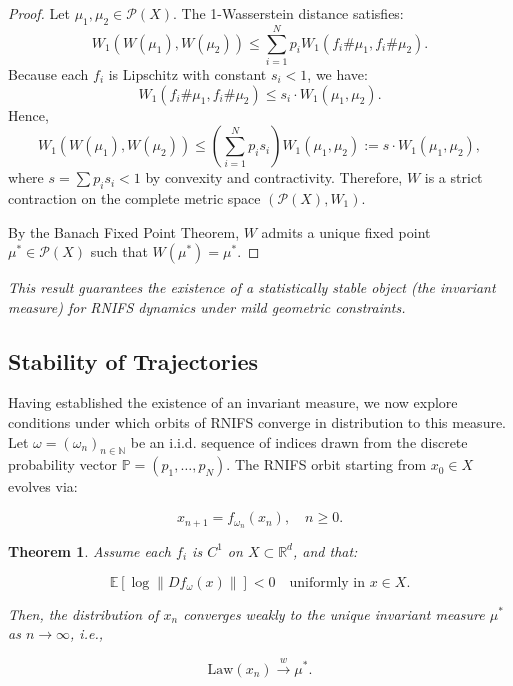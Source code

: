 \documentclass[twocolumn,10pt]{article}
\newtheorem{theorem}{Theorem}
\begin{document}
\begin{proof}
Let $\mu_1, \mu_2 \in \mathcal{P}(X)$. The 1-Wasserstein distance satisfies:
\[
W_1(W(\mu_1), W(\mu_2)) \leq \sum_{i=1}^N p_i W_1(f_i\#\mu_1, f_i\#\mu_2).
\]
Because each $f_i$ is Lipschitz with constant $s_i < 1$, we have:
\[
W_1(f_i\#\mu_1, f_i\#\mu_2) \leq s_i \cdot W_1(\mu_1, \mu_2).
\]
Hence,
\[
W_1(W(\mu_1), W(\mu_2)) \leq \left( \sum_{i=1}^N p_i s_i \right) W_1(\mu_1, \mu_2) := s \cdot W_1(\mu_1, \mu_2),
\]
where $s = \sum p_i s_i < 1$ by convexity and contractivity. Therefore, $W$ is a strict contraction on the complete metric space $(\mathcal{P}(X), W_1)$.

By the Banach Fixed Point Theorem, $W$ admits a unique fixed point $\mu^* \in \mathcal{P}(X)$ such that $W(\mu^*) = \mu^*$.
\end{proof}

\textit{This result guarantees the existence of a statistically stable object (the invariant measure) for RNIFS dynamics under mild geometric constraints.}

\subsection{Stability of Trajectories}
\label{subsec:stability_measure}

Having established the existence of an invariant measure, we now explore conditions under which orbits of RNIFS converge in distribution to this measure. Let $\omega = (\omega_n)_{n \in \mathbb{N}}$ be an i.i.d. sequence of indices drawn from the discrete probability vector $\mathbb{P} = (p_1, \dots, p_N)$. The RNIFS orbit starting from $x_0 \in X$ evolves via:

\begin{equation}
x_{n+1} = f_{\omega_n}(x_n), \quad n \geq 0.
\label{eq:rnifs_orbit}
\end{equation}

\begin{theorem}
\label{thm:stability}
Assume each $f_i$ is $C^1$ on $X \subset \mathbb{R}^d$, and that:

\begin{equation}
\mathbb{E} \left[ \log \| Df_{\omega}(x) \| \right] < 0 \quad \text{uniformly in } x \in X.
\label{eq:lyapunov_condition}
\end{equation}

Then, the distribution of $x_n$ converges weakly to the unique invariant measure $\mu^*$ as $n \to \infty$, i.e.,

\[
\text{Law}(x_n) \xrightarrow{w} \mu^*.
\]
\end{theorem}
\end{document}
